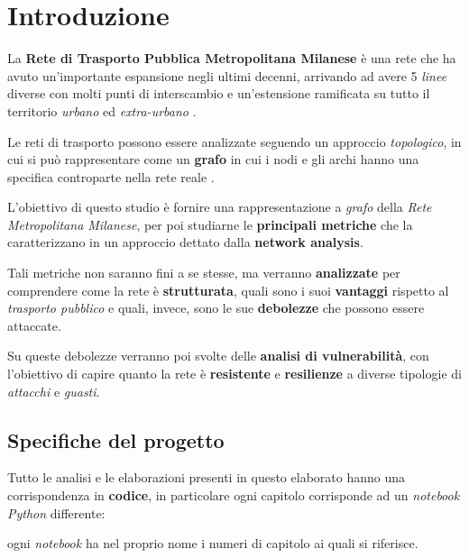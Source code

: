 
\chapter*{Introduzione}

La \textbf{Rete di Trasporto Pubblica Metropolitana Milanese} è una rete che ha avuto un'importante espansione negli ultimi decenni, arrivando ad avere 5 \textit{linee} diverse con molti punti di interscambio e un'estensione ramificata su tutto il territorio \textit{urbano} ed \textit{extra-urbano} \cite{ATM2025}.

Le reti di trasporto possono essere analizzate seguendo un approccio \textit{topologico}, in cui si può rappresentare come un \textbf{grafo} in cui i nodi e gli archi hanno una specifica controparte nella rete reale \cite{MattssonJenelius2015}.

L'obiettivo di questo studio è fornire una rappresentazione a \textit{grafo} della \textit{Rete Metropolitana Milanese}, per poi studiarne le \textbf{principali metriche} che la caratterizzano in un approccio dettato dalla \textbf{network analysis}.

Tali metriche non saranno fini a se stesse, ma verranno \textbf{analizzate} per comprendere come la rete è \textbf{strutturata}, quali sono i suoi \textbf{vantaggi} rispetto al \textit{trasporto pubblico} e quali, invece, sono le sue \textbf{debolezze} che possono essere attaccate.

Su queste debolezze verranno poi svolte delle \textbf{analisi di vulnerabilità}, con l'obiettivo di capire quanto la rete è \textbf{resistente} e \textbf{resilienze} a diverse tipologie di \textit{attacchi} e \textit{guasti}.

\section*{Specifiche del progetto}
Tutto le analisi e le elaborazioni presenti in questo elaborato hanno una corrispondenza in \textbf{codice}, in particolare ogni capitolo corrisponde ad un \textit{notebook Python} differente: 

\begin{center}
ogni \textit{notebook} ha nel proprio nome i numeri di capitolo ai quali si riferisce.
\end{center}

